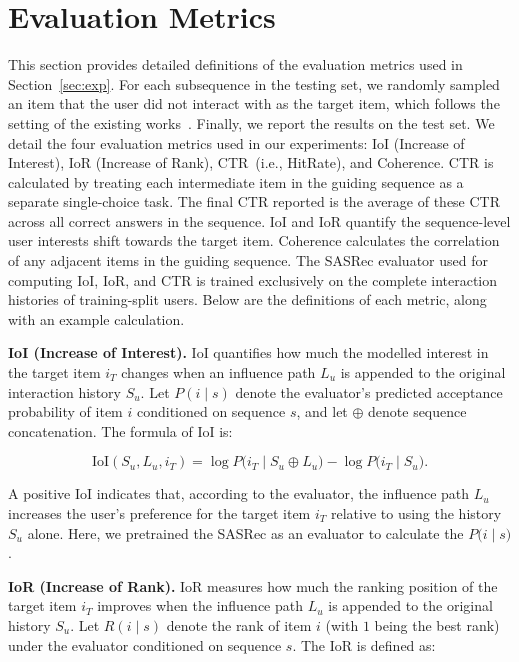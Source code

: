 \section{Evaluation Metrics}
\label{app:evaluation}

This section provides detailed definitions of the evaluation metrics used in Section~\ref{sec:exp}. For each subsequence in the testing set, we randomly sampled an item that the user did not interact with as the target item, which follows the setting of the existing works~\cite{bi2024proactive,wang2025leveraging,wang2025tunable}. Finally, we report the results on the test set. We detail the four evaluation metrics used in our experiments: IoI (Increase of Interest), IoR (Increase of Rank), CTR~(i.e., HitRate), and Coherence. CTR is calculated by treating each intermediate item in the guiding sequence as a separate single-choice task. The final CTR reported is the average of these CTR across all correct answers in the sequence. IoI and IoR quantify the sequence-level user interests shift towards the target item. Coherence calculates the correlation of any adjacent items in the guiding sequence. The SASRec evaluator used for computing IoI, IoR, and CTR is trained exclusively on the complete interaction histories of training-split users. Below are the definitions of each metric, along with an example calculation.

\textbf{IoI (Increase of Interest).} IoI quantifies how much the modelled interest in the target item $i_T$ changes when an influence path $L_u$ is appended to the original interaction history $S_u$. Let $P(i \mid s)$ denote the evaluator's predicted acceptance probability of item $i$ conditioned on sequence $s$, and let $\oplus$ denote sequence concatenation. The formula of IoI is:

\begin{equation}
\mathrm{IoI}(S_u, L_u, i_T)
=
\log P\bigl(i_T \mid S_u \oplus L_u\bigr)
-
\log P\bigl(i_T \mid S_u\bigr).
\end{equation}

A positive IoI indicates that, according to the evaluator, the influence path $L_u$ increases the user's preference for the target item $i_T$ relative to using the history $S_u$ alone. Here, we pretrained the SASRec as an evaluator to calculate the $P\bigl(i \mid s\bigr)$.

\textbf{IoR (Increase of Rank).} IoR measures how much the ranking position of the target item $i_T$ improves when the influence path $L_u$ is appended to the original history $S_u$. Let $R(i \mid s)$ denote the rank of item $i$ (with $1$ being the best rank) under the evaluator conditioned on sequence $s$. The IoR is defined as: 

